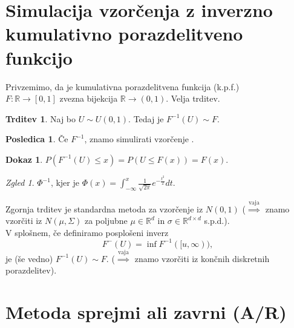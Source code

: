 \documentclass[a4paper, 12pt]{book}
\theoremstyle{definition}
\newtheorem{conseq}[counter]{Posledica}
\newtheorem{claim}[counter]{Trditev}
\newtheorem{pro}[counter]{Dokaz}
\theoremstyle{remark}
\newtheorem*{exmp}{Zgled}
\newcommand{\R}{\mathbb{R}}
\begin{document}

\section{Simulacija vzorčenja z inverzno kumulativno porazdelitveno funkcijo}

Privzemimo, da je  kumulativna porazdelitvena funkcija (k.p.f.) \\
$F: \R \to [0,1]$ zvezna bijekcija $\R \to (0,1)$.
Velja trditev.
\begin{claim}
  Naj bo $U \sim U(0,1)$. Tedaj je $F^{-1}(U) \sim F$.
\end{claim}
\begin{conseq}
  Če  $F^{-1}$, znamo simulirati vzorčenje .
\end{conseq}
\begin{pro}
  $P(F^{-1}(U) \leq x) = P(U \leq F(x)) = F(x)$.
\end{pro}
\begin{exmp}
   $\Phi^{-1}$, kjer je $\Phi(x) = \int_{-\infty}^{x} \frac{1}{\sqrt{2\pi}} e^{-\frac{t^2}{2}} dt$.
\end{exmp}
Zgornja trditev je standardna metoda za vzorčenje iz $N(0,1)$
($\stackrel{\text{vaja}}{\implies}$ znamo vzorčiti iz $N(\mu, \Sigma)$ za poljubne $\mu \in \R^d$ in $\sigma \in \R^{d \times d}$ s.p.d.). \\
V splošnem, če definiramo posplošeni inverz
\begin{equation*}
  F^{-}(U) = \inf F^{-1}([u, \infty)),
\end{equation*}
je (še vedno) $F^{-1}(U) \sim F$. ($\stackrel{\text{vaja}}{\implies}$ znamo vzorčiti iz končnih diskretnih porazdelitev).


\section{Metoda sprejmi ali zavrni (A/R)}
\end{document}
